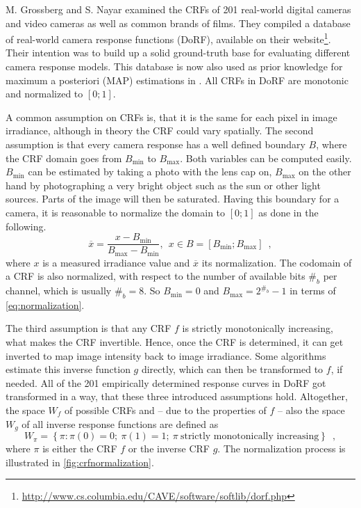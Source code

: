 M. Grossberg and S. Nayar examined the CRFs of 201 real-world digital cameras and video cameras as well as common brands of films. They compiled a database of real-world camera response functions (DoRF), available on their website\footnote{\url{http://www.cs.columbia.edu/CAVE/software/softlib/dorf.php}}. Their intention was to build up a solid ground-truth base for evaluating different camera response models. This database is now also used as prior knowledge for maximum a posteriori (MAP) estimations in \cite{Lin04radiometriccalibration}. All CRFs in DoRF are monotonic and normalized to $[0; 1]$.

A common assumption on CRFs is, that it is the same for each pixel in image irradiance, although in theory the CRF could vary spatially. The second assumption is that every camera response has a well defined boundary $B$, where the CRF domain goes from $B_\text{min}$ to $B_\text{max}$. Both variables can be computed easily. $B_\text{min}$ can be estimated by taking a photo with the lens cap on, $B_\text{max}$ on the other hand by photographing a very bright object such as the sun or other light sources. Parts of the image will then be saturated. Having this boundary for a camera, it is reasonable to normalize the domain to $[0; 1]$ as done in the following.
\begin{equation}
	\overline{x} = \frac{x - B_\text{min}}{B_\text{max} - B_\text{min}}, \ \ x \in B = [B_\text{min}; B_\text{max}] \enspace ,
	\label{eq:normalization}
\end{equation}
where $x$ is a measured irradiance value and $\overline{x}$ its normalization. The codomain of a CRF is also normalized, with respect to the number of available bits $\#_b$ per channel, which is usually $\#_b = 8$. So $B_\text{min} = 0$ and $B_\text{max} = 2^{\#_b}-1$ in terms of \autoref{eq:normalization}. 

The third assumption is that any CRF $f$ is strictly monotonically increasing, what makes the CRF invertible. Hence, once the CRF is determined, it can get inverted to map image intensity back to image irradiance. Some algorithms estimate this inverse function $g$ directly, which can then be transformed to $f$, if needed. All of the 201 empirically determined response curves in DoRF got transformed in a way, that these three introduced assumptions hold. Altogether, the space $W_f$ of possible CRFs and -- due to the properties of $f$ -- also the space $W_g$ of all inverse response functions are defined as
\begin{equation}
	W_\pi = \left\{\pi:\pi(0) = 0;\ \pi(1) = 1;\ \pi \ \text{strictly monotonically increasing}\right\} \enspace ,
	\label{eq:spaceofCRFs}
\end{equation}
where $\pi$ is either the CRF $f$ or the inverse CRF $g$. The normalization process is illustrated in \autoref{fig:crfnormalization}.

